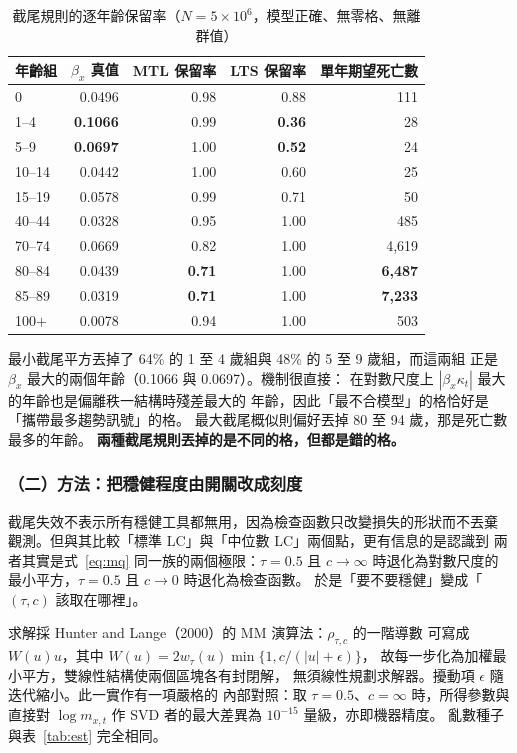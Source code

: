 \documentclass[UTF8, fontset=macnew, a4paper, 12pt]{ctexart}
\begin{document}
\begin{table}[H]
\centering
\caption{截尾規則的逐年齡保留率（$N=5\times10^6$，模型正確、無零格、無離群值）}
\small
\begin{tabular}{lrrrr}
\toprule
年齡組 & $\beta_x$ 真值 & MTL 保留率 & LTS 保留率 & 單年期望死亡數\\
\midrule
0        & 0.0496 & 0.98 & 0.88 & 111\\
1--4     & \textbf{0.1066} & 0.99 & \textbf{0.36} & \phantom{0,0}28\\
5--9     & \textbf{0.0697} & 1.00 & \textbf{0.52} & \phantom{0,0}24\\
10--14   & 0.0442 & 1.00 & 0.60 & \phantom{0,0}25\\
15--19   & 0.0578 & 0.99 & 0.71 & \phantom{0,0}50\\
40--44   & 0.0328 & 0.95 & 1.00 & \phantom{0,}485\\
70--74   & 0.0669 & 0.82 & 1.00 & 4,619\\
80--84   & 0.0439 & \textbf{0.71} & 1.00 & \textbf{6,487}\\
85--89   & 0.0319 & \textbf{0.71} & 1.00 & \textbf{7,233}\\
100$+$   & 0.0078 & 0.94 & 1.00 & \phantom{0,}503\\
\bottomrule
\end{tabular}
\label{tab:retain}
\end{table}

最小截尾平方丟掉了 64\% 的 1 至 4 歲組與 48\% 的 5 至 9 歲組，而這兩組
正是 $\beta_x$ 最大的兩個年齡（0.1066 與 0.0697）。機制很直接：
在對數尺度上 $|\beta_x\kappa_t|$ 最大的年齡也是偏離秩一結構時殘差最大的
年齡，因此「最不合模型」的格恰好是「攜帶最多趨勢訊號」的格。
最大截尾概似則偏好丟掉 80 至 94 歲，那是死亡數最多的年齡。
\textbf{兩種截尾規則丟掉的是不同的格，但都是錯的格。}

\subsubsection{（二）方法：把穩健程度由開關改成刻度}

截尾失效不表示所有穩健工具都無用，因為檢查函數只改變損失的形狀而不丟棄
觀測。但與其比較「標準 LC」與「中位數 LC」兩個點，更有信息的是認識到
兩者其實是式~\eqref{eq:mq} 同一族的兩個極限：$\tau=0.5$ 且 $c\to\infty$
時退化為對數尺度的最小平方，$\tau=0.5$ 且 $c\to0$ 時退化為檢查函數。
於是「要不要穩健」變成「$(\tau,c)$ 該取在哪裡」。

求解採 Hunter and Lange（2000）的 MM 演算法：$\rho_{\tau,c}$ 的一階導數
可寫成 $W(u)u$，其中 $W(u)=2w_\tau(u)\min\{1,c/(|u|+\epsilon)\}$，
故每一步化為加權最小平方，雙線性結構使兩個區塊各有封閉解，
無須線性規劃求解器。擾動項 $\epsilon$ 隨迭代縮小。此一實作有一項嚴格的
內部對照：取 $\tau=0.5$、$c=\infty$ 時，所得參數與直接對
$\log m_{x,t}$ 作 SVD 者的最大差異為 $10^{-15}$ 量級，亦即機器精度。
亂數種子與表~\ref{tab:est} 完全相同。
\end{document}
